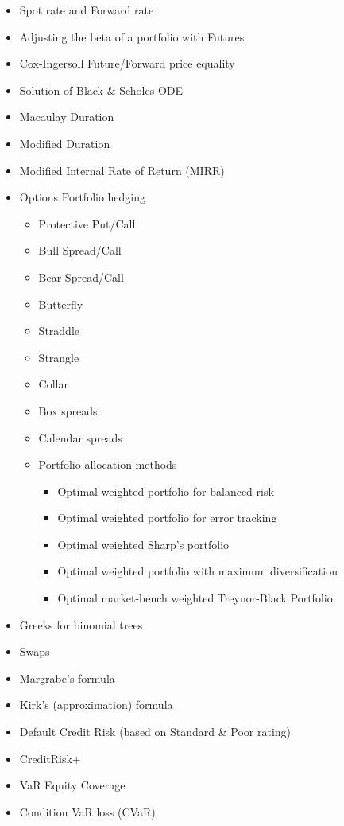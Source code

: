 \begin{itemize}
\begin{itemize}
				\item Spot rate and Forward rate
				\item Adjusting the beta of a portfolio with Futures
				\item Cox-Ingersoll Future/Forward price equality 
				\item Solution of Black \& Scholes ODE
				\item Macaulay Duration 
				\item Modified Duration
				\item Modified Internal Rate of Return (MIRR)
				\item Options Portfolio hedging
				\begin{itemize}
					\item Protective Put/Call
					\item Bull Spread/Call
					\item Bear Spread/Call
					\item Butterfly
					\item Straddle
					\item Strangle
					\item Collar
					\item Box spreads
					\item Calendar spreads
					\item Portfolio allocation methods
					\begin{itemize}
						\item Optimal weighted portfolio for balanced risk 
						\item Optimal weighted portfolio for error tracking
						\item Optimal weighted Sharp's portfolio
						\item Optimal weighted portfolio with maximum diversification
						\item Optimal market-bench weighted Treynor-Black Portfolio
					\end{itemize}
				\end{itemize}
				\item Greeks for binomial trees
				\item Swaps
				\item Margrabe's formula
				\item Kirk's (approximation) formula
				\item Default Credit Risk (based on Standard \& Poor rating)
				\item CreditRisk+
				\item VaR Equity Coverage
				\item Condition VaR loss (CVaR)

\end{itemize}
\end{itemize}
